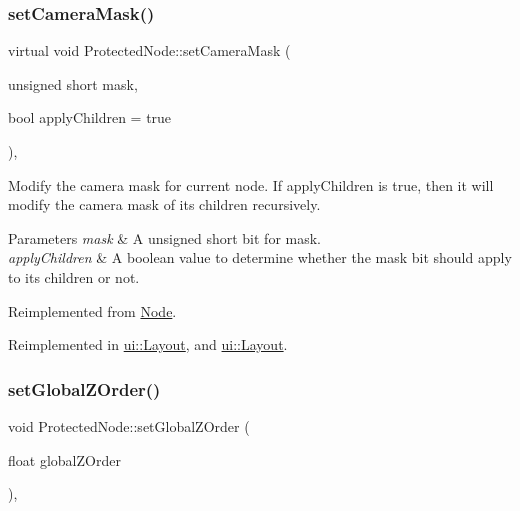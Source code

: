 \subsubsection{\texorpdfstring{set\+Camera\+Mask()}{setCameraMask()}\hspace{0.1cm}{\footnotesize\ttfamily [2/2]}}
{\footnotesize\ttfamily virtual void Protected\+Node\+::set\+Camera\+Mask (\begin{DoxyParamCaption}\item[{unsigned short}]{mask,  }\item[{bool}]{apply\+Children = {\ttfamily true} }\end{DoxyParamCaption})\hspace{0.3cm}{\ttfamily [override]}, {\ttfamily [virtual]}}

Modify the camera mask for current node. If apply\+Children is true, then it will modify the camera mask of its children recursively. 
\begin{DoxyParams}{Parameters}
{\em mask} & A unsigned short bit for mask. \\
\hline
{\em apply\+Children} & A boolean value to determine whether the mask bit should apply to its children or not. \\
\hline
\end{DoxyParams}


Reimplemented from \hyperlink{classNode_a0403546687b2cb6fc211fb461e33ba4d}{Node}.



Reimplemented in \hyperlink{classui_1_1Layout_a7468a69a70aa481c7a429db365f0362c}{ui\+::\+Layout}, and \hyperlink{classui_1_1Layout_a38e44717b8af16b5b5c1f299081ae854}{ui\+::\+Layout}.

\mbox{\label{classProtectedNode_a0d067b9056a934255c7a44a675dc9e92}} 
\subsubsection{\texorpdfstring{set\+Global\+Z\+Order()}{setGlobalZOrder()}}
{\footnotesize\ttfamily void Protected\+Node\+::set\+Global\+Z\+Order (\begin{DoxyParamCaption}\item[{float}]{global\+Z\+Order }\end{DoxyParamCaption})\hspace{0.3cm}{\ttfamily [override]}, {\ttfamily [virtual]}}

